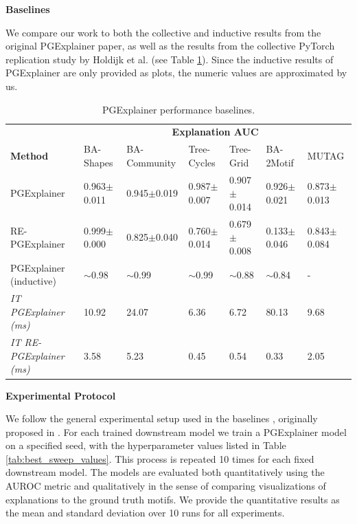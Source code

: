  \bigskip

\textbf{Baselines}\par
 We compare our work to both the collective and inductive results from the original PGExplainer paper, as well as the results from the collective PyTorch replication study by Holdijk et al. \cite{holdijk2021re} (see Table \ref{tab:pgexplainer_baseline}). Since the inductive results of PGExplainer are only provided as plots, the numeric values are approximated by us.

\begin{table}[ht]
    \centering
    \scriptsize
    \begin{tabularx}{\textwidth}{l*{6}{X}}   %
    \toprule
    \textbf{} & \multicolumn{6}{c}{\textbf{Explanation AUC}} \\
    \cmidrule{2-7}
    \textbf{Method} & BA-Shapes & BA-Community & Tree-Cycles & Tree-Grid & BA-2Motif & MUTAG \\
    \midrule
    PGExplainer & 0.963$\pm$0.011 & 0.945$\pm$0.019 & 0.987$\pm$0.007 & 0.907$\pm$0.014 & 0.926$\pm$0.021 & 0.873$\pm$0.013 \\
    \midrule
    RE-PGExplainer & 0.999$\pm$0.000 & 0.825$\pm$0.040 & 0.760$\pm$0.014 & 0.679$\pm$0.008 & 0.133$\pm$0.046 & 0.843$\pm$0.084 \\
    \midrule
    PGExplainer (inductive) & $\sim$0.98 & $\sim$0.99 & $\sim$0.99 & $\sim$0.88 & $\sim$0.84 & - \\
    \midrule
    \textit{IT PGExplainer (ms)} & 10.92 & 24.07 & 6.36 & 6.72 & 80.13 & 9.68 \\
    \textit{IT RE-PGExplainer (ms)} & 3.58 & 5.23 & 0.45 & 0.54 & 0.33 & 2.05 \\
    \bottomrule
    \end{tabularx}
    \caption[Baseline PGExplainer and RE-PGExplainer]{PGExplainer performance baselines.}
    \label{tab:pgexplainer_baseline}
\end{table}


\textbf{Experimental Protocol}\par
We follow the general experimental setup used in the baselines \cite{luo2020parameterized} \cite{holdijk2021re}, originally proposed in \cite{ying2019gnnexplainer}. For each trained downstream model we train a PGExplainer model on a specified seed, with the hyperparameter values listed in Table \ref{tab:best_sweep_values}. This process is repeated 10 times for each fixed downstream model. The models are evaluated both quantitatively using the AUROC metric and qualitatively in the sense of comparing visualizations of explanations to the ground truth motifs. We provide the quantitative results as the mean and standard deviation over 10 runs for all experiments. \bigskip


